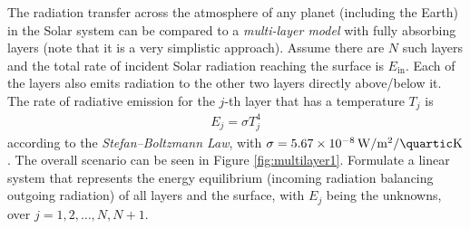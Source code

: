 \begin{exmp}
\label{exmp:multilayer1}
The radiation transfer across the atmosphere of any planet (including the Earth) in the Solar system can be compared to a \textit{multi-layer model} with fully absorbing layers (note that it is a very simplistic approach). Assume there are $N$ such layers and the total rate of incident Solar radiation reaching the surface is $E_{\text{in}}$. Each of the layers also emits radiation to the other two layers directly above/below it. The rate of radiative emission for the $j$-th layer that has a temperature $T_j$ is
\begin{align}
E_j = \sigma T_j^4    
\end{align}
according to the \textit{Stefan–Boltzmann Law}, with $\sigma = \SI{5.67e-8}{\W \per \square\m \per \quartic\K}$. The overall scenario can be seen in Figure \ref{fig:multilayer1}. Formulate a linear system that represents the energy equilibrium (incoming radiation balancing outgoing radiation) of all layers and the surface, with $E_j$ being the unknowns, over $j = 1, 2, \ldots, N, N+1$.
\end{exmp}
